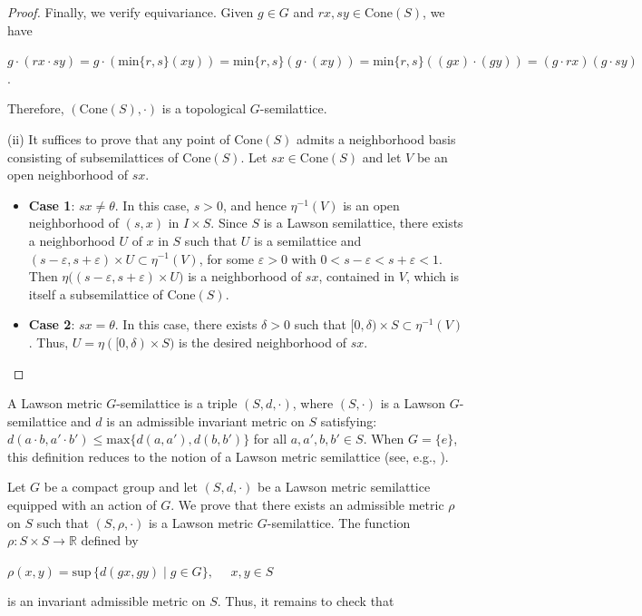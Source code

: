 \documentclass[12pt]{amsart}
\theoremstyle{definition}
\begin{document}
\begin{proof}
		Finally, we verify equivariance. Given $g\in G$ and $rx,sy\in \mathrm{Cone}(S)$, we have
		
		\begin{center}
			$g\cdot (rx\cdot sy)=g\cdot (\mbox{min}\{r,s\}(xy))=\mbox{min}\{r,s\}(g\cdot (xy))=\mbox{min}\{r,s\}((gx)\cdot (gy))=(g\cdot rx)(g\cdot sy)$.
		\end{center}
		Therefore, $(\mathrm{Cone}(S),\cdot)$ is a topological $G$-semilattice.   
		
		(ii) It suffices to prove that any point of $\mathrm{Cone}(S)$ admits a neighborhood basis consisting of subsemilattices of $\mathrm{Cone}(S)$. Let $sx\in \mathrm{Cone}(S)$ and let $V$ be an open neighborhood of $sx$.
		
		\begin{itemize}
			\item \textbf{Case 1}: $sx\neq \theta$. In this case, $s > 0$, and hence $\eta^{-1}(V)$ is an open neighborhood of $(s,x)$ in $I\times S$. Since $S$ is a Lawson semilattice, there exists a neighborhood $U$ of $x$ in $S$ such that $U$ is a semilattice and $(s-\varepsilon,s+\varepsilon)\times U\subset \eta^{-1}(V)$, for some $\varepsilon>0$ with  $0<s-\varepsilon<s+\varepsilon<1$. Then $\eta\big((s-\varepsilon,s+\varepsilon)\times U\big)$ is a neighborhood of $sx$, contained in $V$, which is itself a subsemilattice of $\mathrm{Cone}(S)$.
			
			\item \textbf{Case 2}: $sx=\theta$. In this case, there exists $\delta>0$ such that $[0,\delta)\times S\subset \eta^{-1}(V)$. Thus, $U=\eta([0,\delta)\times S)$ is the desired neighborhood of $sx$.
		\end{itemize}
	\end{proof}
		
	A Lawson metric $G$-semilattice is a triple $(S,d,\cdot)$, where $(S,\cdot)$ is a Lawson $G$-semilattice and $d$ is an admissible invariant metric on $S$ satisfying: $d(a\cdot b,a'\cdot b')\leq\mbox{max}\{d(a,a'),d(b,b')\}$ for all $a,a',b,b'\in S$. When $G=\{e\}$, this definition reduces to the notion of a Lawson metric semilattice (see, e.g., \cite{Banakh1,KSakaiY}).
	
	Let $G$ be a compact group and let $(S,d,\cdot)$ be a Lawson metric semilattice equipped with an action of $G$. We prove that there exists an admissible metric $\rho$ on $S$ such that $(S,\rho,\cdot)$ is a Lawson metric $G$-semilattice. The function $\rho:S\times S\rightarrow \mathbb{R}$ defined by 
	\begin{center}
		$\rho(x,y)=\text{sup}\, \{d(gx,gy)\mid g\in G\},\quad$  $x,y\in S$
	\end{center}
	is an invariant admissible metric on $S$. Thus, it remains to check that 
	
\end{document}
